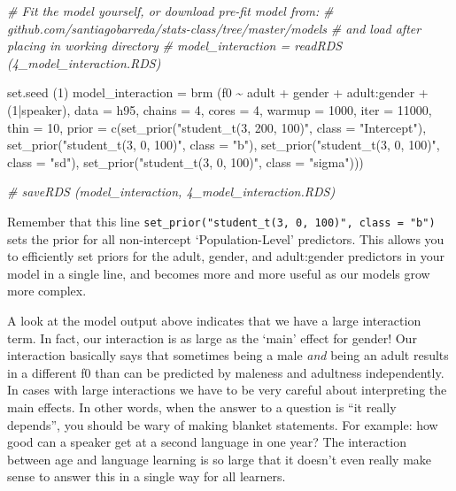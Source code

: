 \documentclass[
]{book}
\newenvironment{Shaded}{\begin{snugshade}}{\end{snugshade}}
\newcommand{\AttributeTok}[1]{\textcolor[rgb]{0.77,0.63,0.00}{#1}}
\newcommand{\CommentTok}[1]{\textcolor[rgb]{0.56,0.35,0.01}{\textit{#1}}}
\newcommand{\DecValTok}[1]{\textcolor[rgb]{0.00,0.00,0.81}{#1}}
\newcommand{\FunctionTok}[1]{\textcolor[rgb]{0.00,0.00,0.00}{#1}}
\newcommand{\NormalTok}[1]{#1}
\newcommand{\OtherTok}[1]{\textcolor[rgb]{0.56,0.35,0.01}{#1}}
\newcommand{\SpecialCharTok}[1]{\textcolor[rgb]{0.00,0.00,0.00}{#1}}
\newcommand{\StringTok}[1]{\textcolor[rgb]{0.31,0.60,0.02}{#1}}
\begin{document}
\begin{Shaded}
\begin{Highlighting}[]
\CommentTok{\# Fit the model yourself, or download pre{-}fit model from: }
\CommentTok{\# github.com/santiagobarreda/stats{-}class/tree/master/models}
\CommentTok{\# and load after placing in working directory}
\CommentTok{\#  model\_interaction = readRDS (\textquotesingle{}4\_model\_interaction.RDS\textquotesingle{})}

\FunctionTok{set.seed}\NormalTok{ (}\DecValTok{1}\NormalTok{)}
\NormalTok{model\_interaction }\OtherTok{=}  
  \FunctionTok{brm}\NormalTok{ (f0 }\SpecialCharTok{\textasciitilde{}}\NormalTok{ adult }\SpecialCharTok{+}\NormalTok{ gender }\SpecialCharTok{+}\NormalTok{ adult}\SpecialCharTok{:}\NormalTok{gender }\SpecialCharTok{+}\NormalTok{ (}\DecValTok{1}\SpecialCharTok{|}\NormalTok{speaker), }\AttributeTok{data =}\NormalTok{ h95, }
       \AttributeTok{chains =} \DecValTok{4}\NormalTok{, }\AttributeTok{cores =} \DecValTok{4}\NormalTok{, }\AttributeTok{warmup =} \DecValTok{1000}\NormalTok{, }\AttributeTok{iter =} \DecValTok{11000}\NormalTok{, }\AttributeTok{thin =} \DecValTok{10}\NormalTok{, }
       \AttributeTok{prior =} \FunctionTok{c}\NormalTok{(}\FunctionTok{set\_prior}\NormalTok{(}\StringTok{"student\_t(3, 200, 100)"}\NormalTok{, }\AttributeTok{class =} \StringTok{"Intercept"}\NormalTok{),}
                              \FunctionTok{set\_prior}\NormalTok{(}\StringTok{"student\_t(3, 0, 100)"}\NormalTok{, }\AttributeTok{class =} \StringTok{"b"}\NormalTok{),}
                              \FunctionTok{set\_prior}\NormalTok{(}\StringTok{"student\_t(3, 0, 100)"}\NormalTok{, }\AttributeTok{class =} \StringTok{"sd"}\NormalTok{),}
                              \FunctionTok{set\_prior}\NormalTok{(}\StringTok{"student\_t(3, 0, 100)"}\NormalTok{, }\AttributeTok{class =} \StringTok{"sigma"}\NormalTok{))) }

\CommentTok{\#  saveRDS (model\_interaction, \textquotesingle{}4\_model\_interaction.RDS\textquotesingle{})}
\end{Highlighting}
\end{Shaded}

Remember that this line \texttt{set\_prior("student\_t(3,\ 0,\ 100)",\ class\ =\ "b")} sets the prior for all non-intercept `Population-Level' predictors. This allows you to efficiently set priors for the adult, gender, and adult:gender predictors in your model in a single line, and becomes more and more useful as our models grow more complex.

A look at the model output above indicates that we have a large interaction term. In fact, our interaction is as large as the `main' effect for gender! Our interaction basically says that sometimes being a male \emph{and} being an adult results in a different f0 than can be predicted by maleness and adultness independently. In cases with large interactions we have to be very careful about interpreting the main effects. In other words, when the answer to a question is ``it really depends'', you should be wary of making blanket statements. For example: how good can a speaker get at a second language in one year? The interaction between age and language learning is so large that it doesn't even really make sense to answer this in a single way for all learners.
\end{document}
